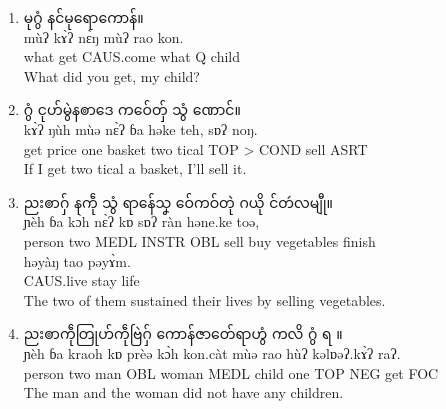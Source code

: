\documentclass[conference]{IEEEtran}
\begin{document}
\begin{enumerate}
\item {\padauktext မုဂွံ နင်မုရောကောန်။ } \\
mùʔ  kɤ̀ʔ  nɛ̀ŋ      mùʔ  rao kon. \\
what get CAUS.come what Q   child \\
What did you get, my child?

\item {\padauktext ဂွံ ၚုဟ်မွဲနၜာဒေ ကဝ်ေတှ် သွံ ဏောင်။ } \\
kɤ̀ʔ  ŋùh  mùə nɛ̀ʔ    ɓa  həke   teh,      sɒʔ  noŋ. \\
get price one basket two tical TOP > COND sell ASRT \\
If I get two tical a basket, I’ll sell it.

\item {\padauktext ညးၜာဂှ် နကဵု သွံ ရာန်ေသၞ ဝ်ေကဝ်တုဲ ဂယို င်တဴလမျီု။ } \\
ɲèh    ɓa  kɔ̀h  nɛ̀ʔ   kɒ  sɒʔ  ràn həne.ke    toə, \\
person two MEDL INSTR OBL sell buy vegetables finish \\
həyàŋ     tao  pəyɤ̀m. \\
CAUS.live stay life \\
The two of them sustained their lives by selling vegetables.

\item {\padauktext ညးၜာကဵုတြုဟ်ကဵုဗြဲဂှ် ကောန်ဇာတ်ေရာဟွံ ကလိ ဂွံ ရ ။} \\
ɲèh    ɓa  kraoh kɒ  prèə  kɔ̀h  kon.càt mùə rao hùʔ kəlɒəʔ.kɤ̀ʔ raʔ.\\
person two man   OBL woman MEDL child   one TOP  NEG   get     FOC \\
The man and the woman did not have any children.
\end{enumerate}
\end{document}
